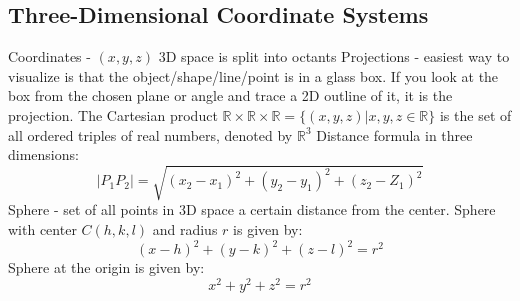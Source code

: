 \documentclass{article}
\begin{document}
    \subsection{Three-Dimensional Coordinate Systems} %
    \begin{outline}
        \1 Coordinates - \((x,y,z)\)
        \1 3D space is split into octants
        \1 Projections - easiest way to visualize is that the object/shape/line/point is in a glass box. If you look at the box from the chosen plane or angle and trace a 2D outline of it, it is the projection. 
        \1 The Cartesian product \(\mathbb{R}\times\mathbb{R}\times\mathbb{R}=\{(x,y,z)|x,y,z\in\mathbb{R}\}\) is the set of all ordered triples of real numbers, denoted by \(\mathbb{R}^3\)
        \1 Distance formula in three dimensions: \[|P_1P_2|=\sqrt{(x_2-x_1)^2+(y_2-y_1)^2+(z_2-Z_1)^2}\]
        \1 Sphere - set of all points in 3D space a certain distance from the center. 
            \2 Sphere with center \(C(h,k,l)\) and radius $r$ is given by: \[(x-h)^2+(y-k)^2+(z-l)^2=r^2\]
            \2 Sphere at the origin is given by: \[x^2+y^2+z^2=r^2\]
        
    \end{outline}
    
\end{document}
